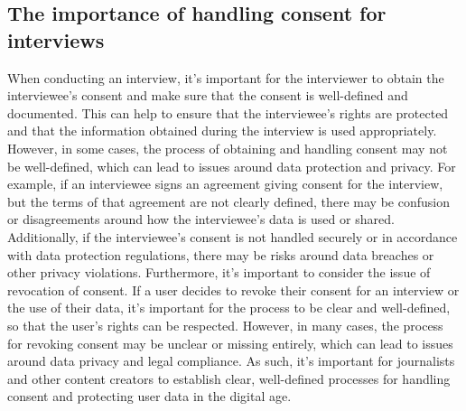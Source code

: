 \documentclass[target=mst,aauheader=]{thud}
\begin{document}
\subsection{The importance of handling consent for interviews}

When conducting an interview, it's important for the interviewer to obtain the interviewee's consent and make sure that the consent is well-defined and documented. This can help to ensure that the interviewee's rights are protected and that the information obtained during the interview is used appropriately. However, in some cases, the process of obtaining and handling consent may not be well-defined, which can lead to issues around data protection and privacy. For example, if an interviewee signs an agreement giving consent for the interview, but the terms of that agreement are not clearly defined, there may be confusion or disagreements around how the interviewee's data is used or shared. Additionally, if the interviewee's consent is not handled securely or in accordance with data protection regulations, there may be risks around data breaches or other privacy violations. Furthermore, it's important to consider the issue of revocation of consent.
If a user decides to revoke their consent for an interview or the use of their data, it's important for the process to be clear and well-defined, so that the user's rights can be respected. However, in many cases, the process for revoking consent may be unclear or missing entirely, which can lead to issues around data privacy and legal compliance. As such, it's important for journalists and other content creators to establish clear, well-defined processes for handling consent and protecting user data in the digital age.\par
\end{document}
